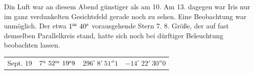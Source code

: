 Din Luft war an diesem Abend günstiger als am 10. Am 13. dagegen war Iris nur im ganz verdunkelten Gesichtsfeld gerade noch zu sehen. Eine Beobachtung war unmöglich. Der etwa $1^{\rm m}\ 40^{\rm s}$ vorausgehende Stern 7. 8. Größe, der auf fast demselben Parallelkreis stand, hatte sich noch bei dürftiger Beleuchtung beobachten lassen.

\begin{center}
\begin{tabular}{l|r|r|r}
Sept. 19 & $7^{\rm u}\ 52^{\rm m}\ 19^{\rm s}9$ & $296^\circ\ 8'\ 51''1$ & $-14^\circ\ 22'\ 30''0$ \\
\end{tabular}
\end{center}
